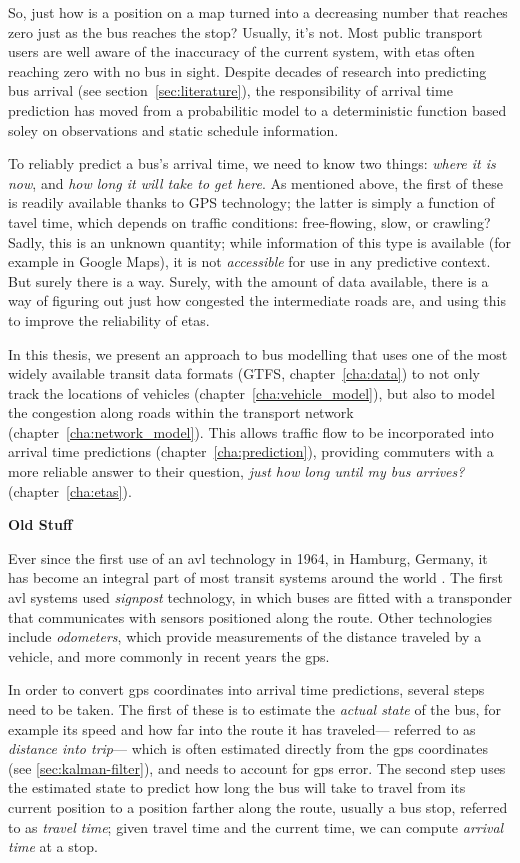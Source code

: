 So, just how is a position on a map turned into a
decreasing number that reaches zero just as the bus reaches the stop?
Usually, it's not.
Most public transport users are well aware of the inaccuracy of the current system,
with \glspl{eta} often reaching zero with no bus in sight.
Despite decades of research into predicting bus arrival (see section~\ref{sec:literature}),
the responsibility of arrival time prediction has moved from a probabilitic model
to a deterministic function based soley on observations and static schedule information.


To reliably predict a bus's arrival time,
we need to know two things:
\emph{where it is now}, and \emph{how long it will take to get here}.
As mentioned above, the first of these is readily available thanks to  GPS technology;
the latter is simply a function of tavel time,
which depends on traffic conditions: free-flowing, slow, or crawling?
Sadly, this is an unknown quantity;
while information of this type is available (for example in Google Maps),
it is not \emph{accessible} for use in any predictive context.
But surely there is a way.
Surely, with the amount of data available, there is a way of figuring out
just how congested the intermediate roads are,
and using this to improve the reliability of \glspl{eta}.


In this thesis, we present an approach to bus modelling that
uses one of the most widely available transit data formats
(GTFS, chapter~\ref{cha:data})
to not only track the \rt{} locations of vehicles
(chapter~\ref{cha:vehicle_model}),
but also to model the congestion along roads within the transport network
(chapter~\ref{cha:network_model}).
This allows traffic flow to be incorporated into arrival time predictions
(chapter~\ref{cha:prediction}),
providing commuters with a more reliable answer to their question,
\emph{just how long until my bus arrives?}
(chapter~\ref{cha:etas}).


\textbf{Old Stuff}


Ever since the first use of an \gls{avl} technology in 1964, in Hamburg, Germany,
it has become an integral part of most transit systems around the world
\citep{TCRP_1997,TCRP_2003}.
The first \gls{avl} systems used \emph{signpost} technology,
in which buses are fitted with a transponder that communicates with
sensors positioned along the route.
Other technologies include \emph{odometers},
which provide measurements of the distance traveled by a vehicle,
and more commonly in recent years the \gls{gps}.


In order to convert \gls{gps} coordinates into arrival time predictions,
several steps need to be taken.
The first of these is to estimate the \emph{actual state} of the bus,
for example its speed and how far into the route it has traveled---%
referred to as \emph{distance into trip}---%
which is often estimated directly from the \gls{gps} coordinates
(see \cref{sec:kalman-filter}),
and needs to account for \gls{gps} error.
The second step uses the estimated state
to predict how long the bus will take to travel from its current position
to a position farther along the route, usually a bus stop,
referred to as \emph{travel time};
given travel time and the current time,
we can compute \emph{arrival time} at a stop.


